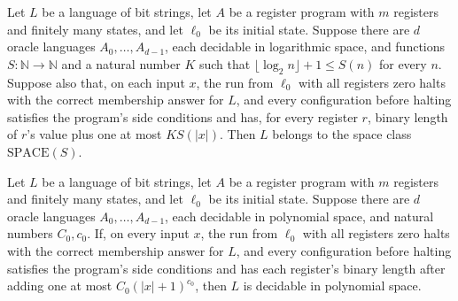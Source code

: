 \begin{theorem}
\label{Complexity.LogProg.arm_decides_SPACE}
\leanok
{}
Let $L$ be a language of bit strings, let $A$ be a register program with $m$ registers
and finitely many states, and let $\ell_0$ be its initial state. Suppose there are $d$
oracle languages $A_0,\ldots,A_{d-1}$, each decidable in logarithmic space, and
functions $S:\mathbb{N}\to\mathbb{N}$ and a natural number $K$ such that $\lfloor\log_2
n\rfloor+1\le S(n)$ for every $n$. Suppose also that, on each input $x$, the run from
$\ell_0$ with all registers zero halts with the correct membership answer for $L$, and
every configuration before halting satisfies the program's side conditions and has, for
every register $r$, binary length of $r$'s value plus one at most $K S(|x|)$. Then $L$
belongs to the space class $\mathrm{SPACE}(S)$.
\end{theorem}

\begin{theorem}
\label{Complexity.LogProg.arm_decides_pspace}
\leanok
{}
Let $L$ be a language of bit strings, let $A$ be a register program with $m$ registers
and finitely many states, and let $\ell_0$ be its initial state. Suppose there are $d$
oracle languages $A_0,\ldots,A_{d-1}$, each decidable in polynomial space, and natural
numbers $C_0,c_0$. If, on every input $x$, the run from $\ell_0$ with all registers zero
halts with the correct membership answer for $L$, and every configuration before halting
satisfies the program's side conditions and has each register's binary length after
adding one at most $C_0(|x|+1)^{c_0}$, then $L$ is decidable in polynomial space.
\end{theorem}


